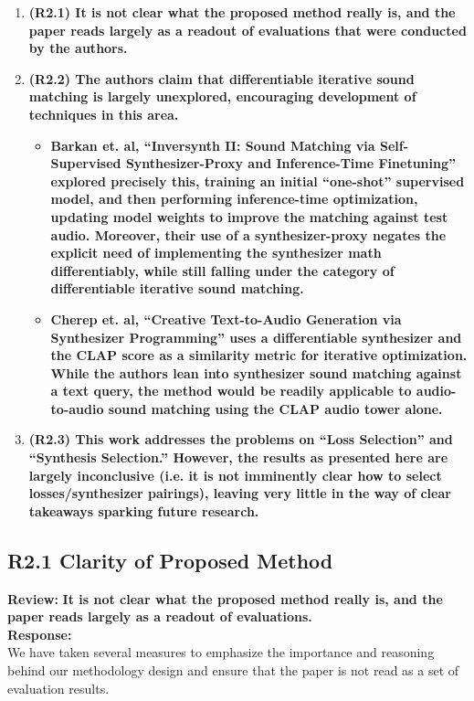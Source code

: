 \documentclass[11pt]{article}
\begin{document}
\begin{enumerate}
  \item \textbf{(R2.1) It is not clear what the proposed method really is, and the paper reads largely as a readout of evaluations that were conducted by the authors.}  
  \item \textbf{(R2.2) The authors claim that differentiable iterative sound matching is largely unexplored, encouraging development of techniques in this area.}  
    \begin{itemize}
      \item \textbf{Barkan et. al, ``Inversynth II: Sound Matching via Self-Supervised Synthesizer-Proxy and Inference-Time Finetuning'' explored precisely this, training an initial ``one-shot'' supervised model, and then performing inference-time optimization, updating model weights to improve the matching against test audio.  Moreover, their use of a synthesizer-proxy negates the explicit need of implementing the synthesizer math differentiably, while still falling under the category of differentiable iterative sound matching.}  
      \item \textbf{Cherep et. al, ``Creative Text-to-Audio Generation via Synthesizer Programming'' uses a differentiable synthesizer and the CLAP score as a similarity metric for iterative optimization.  While the authors lean into synthesizer sound matching against a text query, the method would be readily applicable to audio-to-audio sound matching using the CLAP audio tower alone.}  
    \end{itemize}
  \item \textbf{(R2.3) This work addresses the problems on ``Loss Selection'' and ``Synthesis Selection.''  However, the results as presented here are largely inconclusive (i.e. it is not imminently clear how to select losses/synthesizer pairings), leaving very little in the way of clear takeaways sparking future research.}
\end{enumerate}

\subsection{R2.1 Clarity of Proposed Method}
\label{R2.1}
\noindent\textbf{Review:}
\noindent \textbf{It is not clear what the proposed method really is, and the paper reads largely as a readout of evaluations. } 
\\

\noindent\textbf{Response:} \\
We have taken several measures to emphasize the importance and reasoning behind our methodology design and ensure that the paper is not read as a set of evaluation results.  
\end{document}
